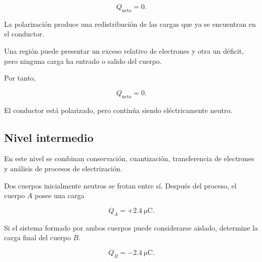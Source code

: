 \begin{respuesta}

\[
\boxed{
Q_{\text{neto}}=0
}.
\]

\end{respuesta}

\begin{explicacion}

La polarización produce una redistribución de las cargas que ya se
encuentran en el conductor.

Una región puede presentar un exceso relativo de electrones y otra un déficit,
pero ninguna carga ha entrado o salido del cuerpo.

Por tanto,

\[
\boxed{
Q_{\text{neto}}=0
}.
\]

El conductor está polarizado, pero continúa siendo eléctricamente neutro.

\end{explicacion}



\subsection{Nivel intermedio}

En este nivel se combinan conservación, cuantización, transferencia de
electrones y análisis de procesos de electrización.



\begin{ejercicio}

Dos cuerpos inicialmente neutros se frotan entre sí. Después del proceso,
el cuerpo \(A\) posee una carga

\[
Q_A=+\SI{2.4}{\micro\coulomb}.
\]

Si el sistema formado por ambos cuerpos puede considerarse aislado, determine
la carga final del cuerpo \(B\).

\end{ejercicio}

\begin{respuesta}

\[
\boxed{
Q_B=-\SI{2.4}{\micro\coulomb}
}.
\]

\end{respuesta}

